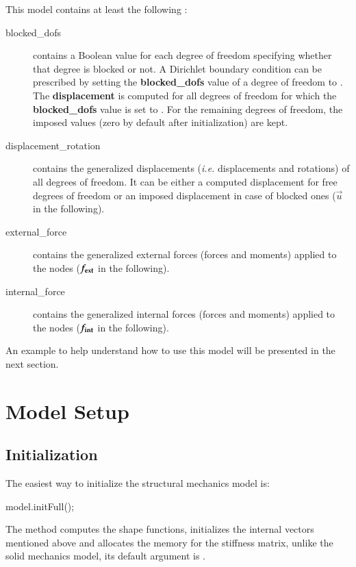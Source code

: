 This model contains at least the following :
\begin{description}
\item[blocked\_dofs] contains a Boolean value for each degree of
  freedom specifying whether that degree is blocked or not. A
  Dirichlet boundary condition can be prescribed by setting the
  \textbf{blocked\_dofs} value of a degree of freedom to
  . The \textbf{displacement} is computed for all degrees
  of freedom for which the \textbf{blocked\_dofs} value is set to
  . For the remaining degrees of freedom, the imposed
  values (zero by default after initialization) are kept.



\item[displacement\_rotation] contains the generalized displacements
  (\textit{i.e.} displacements and rotations) of all degrees of freedom. It can be
  either a computed displacement for free degrees of freedom or an
  imposed displacement in case of blocked ones ($\vec{u}$ in the
  following).

\item[external\_force] contains the generalized external forces (forces
  and moments) applied to the nodes ($\boldsymbol{f_{{\mathrm{ext}}}}$ in the
  following).

\item[internal\_force] contains the generalized internal forces (forces
  and moments) applied to the nodes ($\boldsymbol{f_{{\mathrm{int}}}}$ in the
  following).
\end{description}

An example to help understand how  to use this model will be presented in the
next section.

\section{Model Setup}
\label{sec:structMechMod:setup}

\subsection{Initialization}
The easiest way to initialize the structural mechanics model is:

\begin{cpp}
  model.initFull();
\end{cpp}
The method  computes the shape functions, initializes
the internal vectors mentioned above and allocates the memory for the
stiffness matrix, unlike the solid mechanics model, its default argument is .

